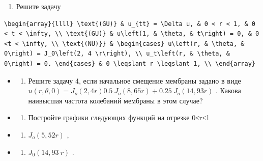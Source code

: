 \documentclass[
  ukrainian,
]{article}
\providecommand{\tightlist}{%
  \setlength{\itemsep}{0pt}\setlength{\parskip}{0pt}}
\begin{document}
\begin{enumerate}
\def\labelenumi{\arabic{enumi}.}
\setcounter{enumi}{3}
\tightlist
\item
  Решите задачу
\end{enumerate}

\begin{verbatim}
\begin{array}{llll} \text{(GU)} & u_{tt} = \Delta u, & 0 < r < 1, & 0 < t < \infty, \\ \text{(GU)} & u\left(1, & \theta, & t\right) = 0, & 0 <t < \infty, \\ \text{(NU)}} & \begin{cases} u\left(r, & \theta, & 0\right) = J_0\left(2, 4 \r\right), \\ u_t\left(r, & \theta, & 0\right) = 0. \end{cases} & 0 \leqslant r \leqslant 1, \\ \end{array}
\end{verbatim}

\begin{itemize}
\tightlist
\item
  \begin{enumerate}
  \def\labelenumi{\arabic{enumi}.}
  \setcounter{enumi}{4}
  \tightlist
  \item
    Решите задачу 4, если начальное смещение мембраны задано в виде
    \(u(r, \theta, 0) = J_{\mathrm{ }o}(2,4r) 0.5\ J_{\mathrm{ }o}(8,65r) + 0.25\ J_{\mathrm{ }o}(14,93r)\)
    . Какова наивысшая частота колебаний мембраны в этом случае?
  \end{enumerate}
\item
  \begin{enumerate}
  \def\labelenumi{\arabic{enumi}.}
  \setcounter{enumi}{5}
  \tightlist
  \item
    Постройте графики следующих функций на отрезке 0≤r≤1
  \end{enumerate}
\item
  \begin{enumerate}
  \def\labelenumi{\alph{enumi})}
  \tightlist
  \item
    \(J_{o}(5,52 r)\) ,
  \end{enumerate}
\item
  \begin{enumerate}
  \def\labelenumi{\arabic{enumi})}
  \setcounter{enumi}{5}
  \tightlist
  \item
    \(J_0(14,93 \ r)\) .
  \end{enumerate}
\end{itemize}
\end{document}
